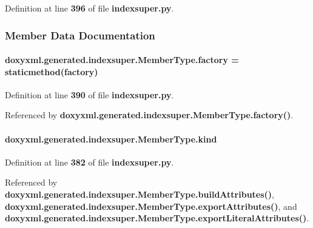 Definition at line {\bf 396} of file {\bf indexsuper.\+py}.



\subsubsection{Member Data Documentation}
\paragraph[{factory}]{\setlength{\rightskip}{0pt plus 5cm}doxyxml.\+generated.\+indexsuper.\+Member\+Type.\+factory = staticmethod(factory)\hspace{0.3cm}{\ttfamily [static]}}\label{classdoxyxml_1_1generated_1_1indexsuper_1_1MemberType_a0cae9a5e53c0e3b02a7f84baca9e42d9}


Definition at line {\bf 390} of file {\bf indexsuper.\+py}.



Referenced by {\bf doxyxml.\+generated.\+indexsuper.\+Member\+Type.\+factory()}.

\paragraph[{kind}]{\setlength{\rightskip}{0pt plus 5cm}doxyxml.\+generated.\+indexsuper.\+Member\+Type.\+kind}\label{classdoxyxml_1_1generated_1_1indexsuper_1_1MemberType_a4bc56822e85868810605c91ffbc0d3dd}


Definition at line {\bf 382} of file {\bf indexsuper.\+py}.



Referenced by {\bf doxyxml.\+generated.\+indexsuper.\+Member\+Type.\+build\+Attributes()}, {\bf doxyxml.\+generated.\+indexsuper.\+Member\+Type.\+export\+Attributes()}, and {\bf doxyxml.\+generated.\+indexsuper.\+Member\+Type.\+export\+Literal\+Attributes()}.

